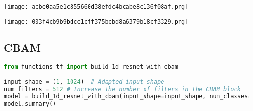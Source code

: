 \texttt{[image: acbe0aa5e1c855660d38efdc4bcabe8c136f08af.png]}

\texttt{[image: 003f4cb9b9bdcc1cff375bcbd8a6379b18cf3329.png]}

\hypertarget{cbam}{%
\subsection{CBAM}\label{cbam}}

\begin{lstlisting}[language=Python]
from functions_tf import build_1d_resnet_with_cbam

input_shape = (1, 1024)  # Adapted input shape
num_filters = 512 # Increase the number of filters in the CBAM block
model = build_1d_resnet_with_cbam(input_shape=input_shape, num_classes=n_elements, num_filters=num_filters, output_shape=(1, 81), res_block_num=2)
model.summary()
\end{lstlisting}

